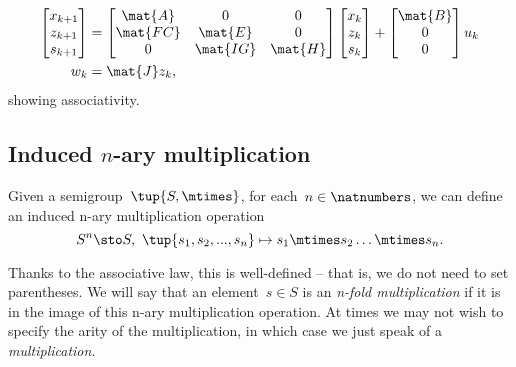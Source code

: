 \begin{equation*}
\label{eq:dlin-7}
\begin{aligned}
\begin{bmatrix}
x_{k+1}\\
z_{k+1}\\
s_{k+1}
\end{bmatrix}&=
\begin{bmatrix}
\mat{A}&0&0\\
\mat{FC}&\mat{E}&0\\
0&\mat{IG}&\mat{H}
\end{bmatrix}\begin{bmatrix} x_k\\ z_k\\ s_k\end{bmatrix}+
\begin{bmatrix}
\mat{B}\\ 0\\ 0
\end{bmatrix}u_k\\
w_k&=\mat{J}z_k,
\end{aligned}
\end{equation*}
showing associativity.

\subsection{Induced $n$-ary multiplication}
Given a semigroup~$\tup{S, \mtimes}$, for each~$n \in \natnumbers$, we can define an induced n-ary multiplication operation
\begin{equation*}
  S^n \sto S, \ \tup{s_1, s_2, ..., s_n} \mapsto s_1 \mtimes s_2 \dots \mtimes s_n.
\end{equation*}





Thanks to the associative law, this is well-defined -- that is, we do not need to set parentheses.
We will say that an element~$s \in S$ is an \emph{n-fold multiplication} if it is in the image of this n-ary multiplication operation.
At times we may not wish to specify the arity of the multiplication, in which case we just speak of a \emph{multiplication}.

\begin{comment}
\begin{equation}\label{eq:mora}
\mora
\end{equation}
\begin{equation}\label{eq:morb}
\morb
\end{equation}
\begin{equation}\label{eq:morab}
\mora\then\morb
\end{equation}

\end{comment}
